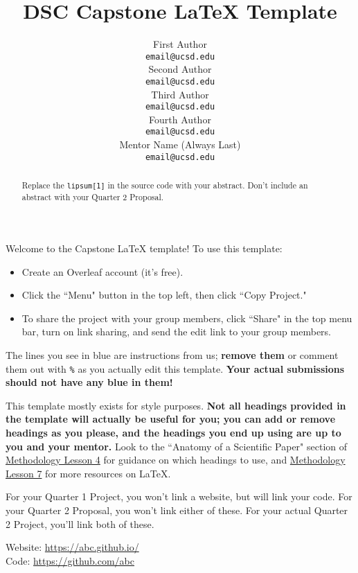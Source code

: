 \documentclass[12pt,letterpaper]{article}
\title{DSC Capstone LaTeX Template}
\author{First Author \\
  {\tt email@ucsd.edu} \\\And
  Second Author \\
  {\tt email@ucsd.edu} \\\And
  Third Author \\
  {\tt email@ucsd.edu} \\\And
  Fourth Author \\
  {\tt email@ucsd.edu} \\\And
  Mentor Name (Always Last) \\
  {\tt email@ucsd.edu} \\}
\begin{document}
\maketitle


{\color{blue} Welcome to the Capstone LaTeX template! To use this template:
\begin{itemize}
    \item Create an Overleaf account (it's free).
    \item Click the ``Menu" button in the top left, then click ``Copy Project."
    \item To share the project with your group members, click ``Share" in the top menu bar, turn on link sharing, and send the edit link to your group members.
\end{itemize}

The lines you see in blue are instructions from us; \textbf{remove them} or comment them out with \texttt{\%} as you actually edit this template. \textbf{Your actual submissions should not have any blue in them!}

This template mostly exists for style purposes. \textbf{Not all headings provided in the template will actually be useful for you; you can add or remove headings as you please, and the headings you end up using are up to you and your mentor.} Look to the ``Anatomy of a Scientific Paper" section of \href{https://dsc-capstone.org/lessons/04/#anatomy-of-a-scientific-paper}{Methodology Lesson 4} for guidance on which headings to use, and \href{https://dsc-capstone.org/assignments/methodology/05/}{Methodology Lesson 7} for more resources on LaTeX.
}

\begin{abstract}
    {
    \color{blue}
    Replace the \texttt{lipsum[1]} in the source code with your abstract. Don't include an abstract with your Quarter 2 Proposal.
    }
    \textcolor{LightGrey}{\lipsum[1]}
\end{abstract}

{\color{blue} For your Quarter 1 Project, you won't link a website, but will link your code. For your Quarter 2 Proposal, you won't link either of these. For your actual Quarter 2 Project, you'll link both of these.}
\begin{center}
Website: \url{https://abc.github.io/} \\
Code: \url{https://github.com/abc}
\end{center}
\end{document}
